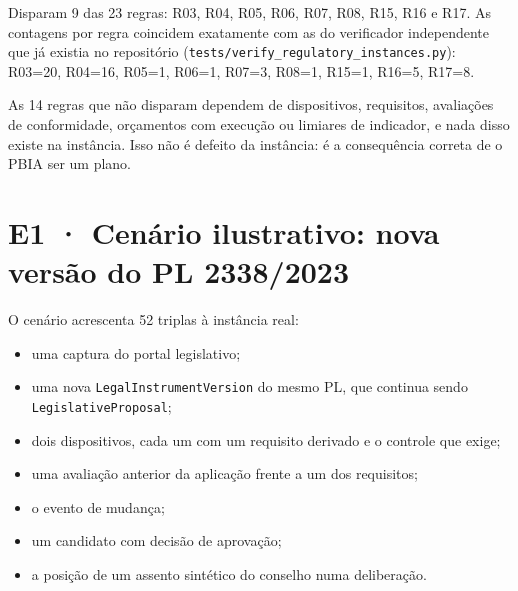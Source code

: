 \documentclass[12pt,a4paper,oneside,english,brazil]{abntex2}
\begin{document}
Disparam 9 das 23 regras: R03, R04, R05, R06, R07, R08, R15, R16 e R17. As contagens por regra coincidem exatamente com as do verificador independente que já existia no repositório (\texttt{tests/verify\_regulatory\_instances.py}): R03=20, R04=16, R05=1, R06=1, R07=3, R08=1, R15=1, R16=5, R17=8.

As 14 regras que não disparam dependem de dispositivos, requisitos, avaliações de conformidade, orçamentos com execução ou limiares de indicador, e nada disso existe na instância. Isso não é defeito da instância: é a consequência correta de o PBIA ser um plano.

\section{E1 · Cenário ilustrativo: nova versão do PL 2338/2023}\label{sec:e1}

\noindent O cenário acrescenta 52 triplas à instância real:
\begin{itemize}[leftmargin=*]
  \item uma captura do portal legislativo;
  \item uma nova \texttt{Legal\-Instrument\-Version} do mesmo PL, que continua sendo \texttt{Legislative\-Proposal};
  \item dois dispositivos, cada um com um requisito derivado e o controle que exige;
  \item uma avaliação anterior da aplicação frente a um dos requisitos;
  \item o evento de mudança;
  \item um candidato com decisão de aprovação;
  \item a posição de um assento sintético do conselho numa deliberação.
\end{itemize}
\end{document}
